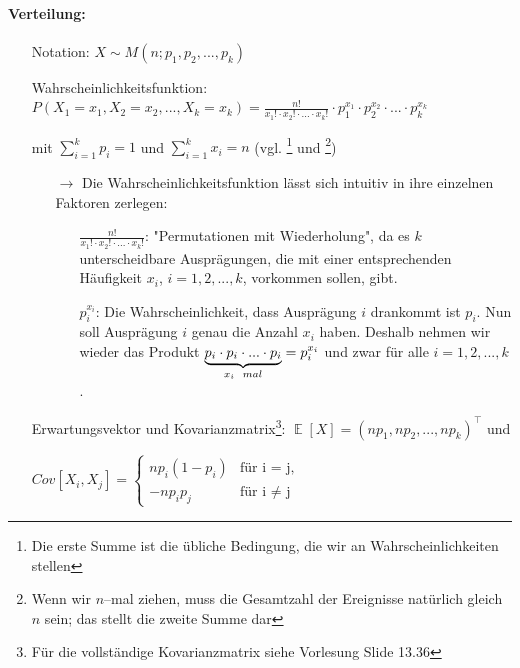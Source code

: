 \documentclass[a4paper]{article}
\DeclareMathOperator*{\E}{\mathbb{E}}
\begin{document}
\paragraph{Verteilung:}
\begin{itemize}
\item[] Notation: $X \sim M(n;p_1,p_2,...,p_k)$
\item[] Wahrscheinlichkeitsfunktion: $P(X_1=x_1,X_2=x_2,...,X_k=x_k)=\frac{n!}{x_1! \cdot x_2! \cdot ... \cdot x_k!} \cdot p_1^{x_1} \cdot p_2^{x_2} \cdot ... \cdot p_k^{x_k}$
\item[] \hspace{4.5cm} mit $\sum_{i=1}^kp_i=1$ und $\sum_{i=1}^kx_i=n$ (vgl. \footnote{Die erste Summe ist die übliche Bedingung, die wir an Wahrscheinlichkeiten stellen} und \footnote{Wenn wir $n$--mal ziehen, muss die Gesamtzahl der Ereignisse natürlich gleich $n$ sein; das stellt die zweite Summe dar})
	\begin{itemize}
	\item[$\rightarrow$] Die Wahrscheinlichkeitsfunktion lässt sich intuitiv in ihre einzelnen Faktoren zerlegen:
		\begin{itemize}
		\item[] $\frac{n!}{x_1! \cdot x_2! \cdot ... \cdot x_k!}$:  "Permutationen mit Wiederholung", da es $k$ unterscheidbare Ausprägungen, die mit einer entsprechenden Häufigkeit $x_i$, $i=1,2,...,k$, vorkommen sollen, gibt.  
		\item[] $p_i^{x_i}$: Die Wahrscheinlichkeit, dass Ausprägung $i$ drankommt ist $p_i$. Nun soll Ausprägung $i$ genau die Anzahl $x_i$ haben. Deshalb nehmen wir wieder das Produkt  $\underbrace{p_i\cdot p_i \cdot ... \cdot p_i}_{x_i \hspace{0.2cm} mal} = p_i^{x_i}$ und zwar für alle $i=1,2,...,k$.
		\end{itemize}
	\end{itemize}
\item[] Erwartungsvektor und Kovarianzmatrix\footnote{Für die vollständige Kovarianzmatrix siehe Vorlesung Slide 13.36}: $\E[X]=(np_1,np_2,...,np_k)^{\top}$ und
\item[] \hspace{6.5cm} $Cov[X_i,X_j]=\begin{cases}
			np_i(1-p_i) & \text{für i = j,}\\
            -np_ip_j & \text{für i $\neq$ j}
		 \end{cases}$ 
\end{itemize}

\noindent {}
\end{document}
